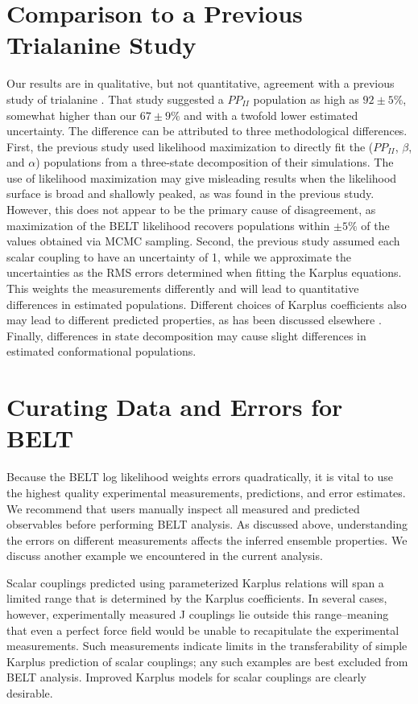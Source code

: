 \documentclass[11pt,titlepage]{article}
\begin{document}
\section*{Comparison to a Previous Trialanine Study}

Our results are in qualitative, but not quantitative, agreement with a previous study of trialanine \citep{Graf2007}.  That study suggested a $PP_{II}$ population as high as $92 \pm 5\%$, somewhat higher than our $67 \pm 9 \%$ and with a twofold lower estimated uncertainty.  The difference can be attributed to three methodological differences.  First, the previous study used likelihood maximization to directly fit the ($PP_{II}$, $\beta$, and $\alpha$) populations from a three-state decomposition of their simulations.  The use of likelihood maximization may give misleading results when the likelihood surface is broad and shallowly peaked, as was found in the previous study.  However, this does not appear to be the primary cause of disagreement, as maximization of the BELT likelihood recovers populations within $\pm 5\%$ of the values obtained via MCMC sampling.  Second, the previous study assumed each scalar coupling to have an uncertainty of 1, while we approximate the uncertainties as the RMS errors 
determined when fitting the Karplus equations.  This weights the measurements differently and will lead to quantitative differences in estimated populations.  Different choices of Karplus coefficients also may lead to different predicted properties, as has been discussed elsewhere \citep{markwick2009structural}.    Finally, differences in state decomposition may cause slight differences in estimated conformational populations.  


\section*{Curating Data and Errors for BELT}

Because the BELT log likelihood weights errors quadratically, it is vital to use the highest quality experimental measurements, predictions, and error estimates.  We recommend that users manually inspect all measured and predicted observables before performing BELT analysis.  As discussed above, understanding the errors on different measurements affects the inferred ensemble properties.  We discuss another example we encountered in the current analysis.  

Scalar couplings predicted using parameterized Karplus relations will span a limited range that is determined by the Karplus coefficients.  In several cases, however, experimentally measured J couplings lie outside this range--meaning that even a perfect force field would be unable to recapitulate the experimental measurements.  Such measurements indicate limits in the transferability of simple Karplus prediction of scalar couplings; any such examples are best excluded from BELT analysis.  Improved  Karplus models for scalar couplings are clearly desirable.  
\end{document}
